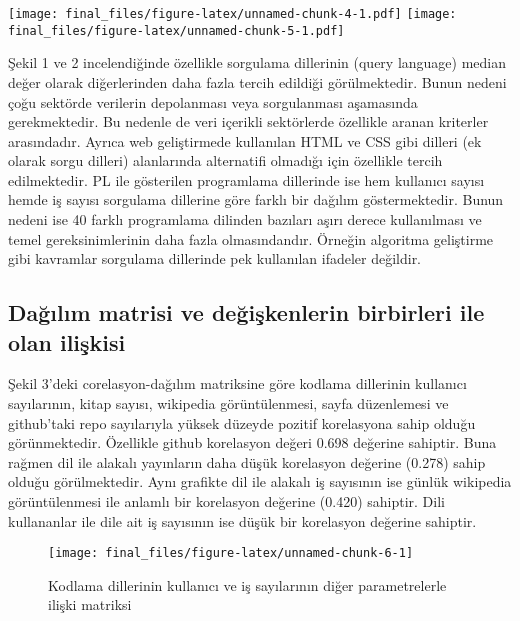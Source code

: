 \documentclass[
  12pt,
]{article}
\begin{document}
\texttt{[image: final\_files/figure-latex/unnamed-chunk-4-1.pdf]}
\texttt{[image: final\_files/figure-latex/unnamed-chunk-5-1.pdf]}

Şekil 1 ve 2 incelendiğinde özellikle sorgulama dillerinin (query language) median değer olarak diğerlerinden daha fazla tercih edildiği görülmektedir. Bunun nedeni çoğu sektörde verilerin depolanması veya sorgulanması aşamasında gerekmektedir. Bu nedenle de veri içerikli sektörlerde özellikle aranan kriterler arasındadır. Ayrıca web geliştirmede kullanılan HTML ve CSS gibi dilleri (ek olarak sorgu dilleri) alanlarında alternatifi olmadığı için özellikle tercih edilmektedir. PL ile gösterilen programlama dillerinde ise hem kullanıcı sayısı hemde iş sayısı sorgulama dillerine göre farklı bir dağılım göstermektedir. Bunun nedeni ise 40 farklı programlama dilinden bazıları aşırı derece kullanılması ve temel gereksinimlerinin daha fazla olmasındandır. Örneğin algoritma geliştirme gibi kavramlar sorgulama dillerinde pek kullanılan ifadeler değildir.

\hypertarget{daux11fux131lux131m-matrisi-ve-deux11fiux15fkenlerin-birbirleri-ile-olan-iliux15fkisi}{%
\subsection{Dağılım matrisi ve değişkenlerin birbirleri ile olan ilişkisi}\label{daux11fux131lux131m-matrisi-ve-deux11fiux15fkenlerin-birbirleri-ile-olan-iliux15fkisi}}

Şekil 3'deki corelasyon-dağılım matriksine göre kodlama dillerinin kullanıcı sayılarının, kitap sayısı, wikipedia görüntülenmesi, sayfa düzenlemesi ve github'taki repo sayılarıyla yüksek düzeyde pozitif korelasyona sahip olduğu görünmektedir. Özellikle github korelasyon değeri 0.698 değerine sahiptir. Buna rağmen dil ile alakalı yayınların daha düşük korelasyon değerine (0.278) sahip olduğu görülmektedir. Aynı grafikte dil ile alakalı iş sayısının ise günlük wikipedia görüntülenmesi ile anlamlı bir korelasyon değerine (0.420) sahiptir. Dili kullananlar ile dile ait iş sayısının ise düşük bir korelasyon değerine sahiptir.

\begin{figure}

\texttt{[image: final\_files/figure-latex/unnamed-chunk-6-1]} \hfill{}

\caption{Kodlama dillerinin kullanıcı ve iş sayılarının diğer parametrelerle ilişki matriksi}\label{fig:unnamed-chunk-6}
\end{figure}
\end{document}
